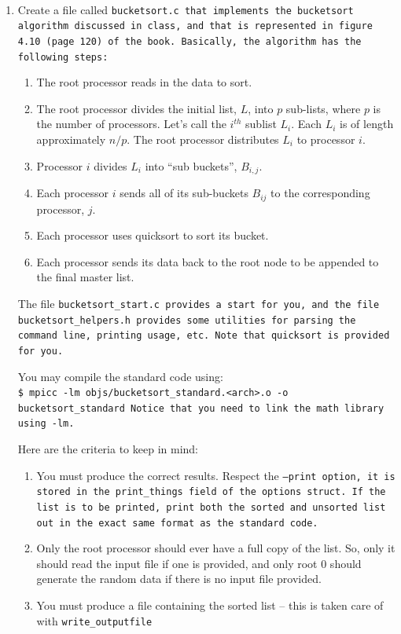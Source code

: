 \documentclass{article}
\begin{document}
\\
\begin{enumerate}
\item Create a file called \tt{bucketsort.c} that implements the
  bucketsort algorithm discussed in class, and that is represented in
  figure 4.10 (page 120) of the book.  Basically, the algorithm has
  the following steps:
  \begin{enumerate}
  \item The root processor reads in the data to sort.  
  \item The root processor divides the initial list, $L$, into $p$
    sub-lists, where $p$ is the number of processors. Let's call the
    $i^{th}$ sublist $L_i$. Each $L_i$ is  of length approximately
    $n/p$.  The root processor distributes $L_i$ to processor $i$. 
  \item Processor $i$ divides $L_i$ into ``sub buckets'',
    $B_{i,j}$.
    
  \item Each processor $i$ sends all of its sub-buckets $B_{ij}$ to
    the corresponding processor, $j$. 

  \item Each processor uses quicksort to sort its bucket.
    
  \item Each processor sends its data back to the root node to be
    appended to the final master list. 
  \end{enumerate}

The file \tt{bucketsort\_start.c} provides a start for you, and the
file \tt{bucketsort\_helpers.h} provides some utilities for parsing
the command line, printing usage, etc.  Note that \tt{quicksort} is
provided for you. 

You may compile the standard code using:\\
\tt{\$ mpicc -lm objs/bucketsort\_standard.<arch>.o -o
  bucketsort\_standard}
Notice that you need to link the math library using \tt{-lm}.

Here are the criteria to keep in mind:
\begin{enumerate}
\item You must produce the correct results.  Respect the \tt{--print}
  option, it is stored in the \tt{print\_things} field of the options
  struct. If the list is to be printed, print both the sorted and
  unsorted list out in the
  exact same format as the standard code. 

\item Only the root processor should ever have a full copy of the
  list.  So, only it should read the input file if one is provided,
  and only root 0 should generate the random data if there is no input
  file provided. 
\item You must produce a file containing the sorted list -- this is
  taken care of with \tt{write\_outputfile}


\end{enumerate}
\end{enumerate}
\end{document}
